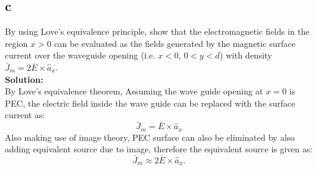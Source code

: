 \documentclass[11pt]{amsart}
\begin{document}
\subsection*{c}
By using Love’s equivalence principle, show that the electromagnetic fields in the
region $x>0$ can be evaluated as the fields generated by the magnetic surface current
over the waveguide opening (i.e. $x<0$, $0<y<d$) with density $\bar{J}_m = 2\bar{E}\times \hat{a}_x$.
\\
\textbf{Solution:}\\
By Love's equivalence theorem, Assuming the wave guide opening at $x=0$ is PEC, the electric field inside the wave guide can be replaced with the surface current as:
\begin{equation}
\bar{J}_m=  \bar{E}\times \hat{a}_x
\end{equation}
Also making use of image theory, PEC surface can also be eliminated by also adding equivalent source due to image, therefore the equivalent source is given as:
\begin{equation}
\bar{J}_m \approx 2\bar{E}\times \hat{a}_x.
\end{equation}
\end{document}
